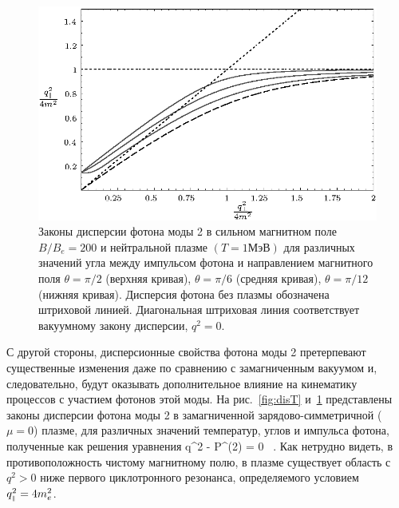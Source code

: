 \begin{figure}[t]
	\centerline{\includegraphics[width=15cm]{fig2_2.eps}} \vspace*{-2mm}
	\caption{Законы дисперсии фотона моды 2 в сильном магнитном поле  $B/B_e = 200$  
		и нейтральной плазме $(T = 1 \mbox{МэВ})$ для различных значений
		угла  между импульсом фотона  и направлением  магнитного поля
		$\theta = \pi/2$ (верхняя кривая), $\theta = \pi/6$  (средняя кривая), $\theta = \pi/12$
		(нижняя кривая).
		Дисперсия фотона без плазмы обозначена штриховой линией.
		Диагональная штриховая линия соответствует вакуумному закону дисперсии, $q^2 = 0$.
	}
	\label{fig:disTheta}
\end{figure}

С другой стороны, дисперсионные свойства фотона моды 2  претерпевают существенные изменения даже по сравнению с замагниченным вакуумом и, следовательно, будут оказывать дополнительное влияние на кинематику процессов с участием фотонов этой моды. На рис.~\ref{fig:disT} и~\ref{fig:disTheta} представлены законы дисперсии фотона моды 2 в замагниченной зарядово-симметричной ($\mu=0$) плазме, для различных значений температур, углов и импульса фотона, полученные как решения уравнения
%
\beq
q^2 - {\cal P}^{(2)} = 0 \, .
\label{disper}
\eeq
\noindent Как нетрудно видеть, в противоположность чистому 
магнитному полю, в плазме существует область с  $q^2 > 0$ ниже  первого  
циклотронного резонанса, определяемого условием $q^2_{\mbox{\tiny $\|$}} = 4 m_e^2$. 

